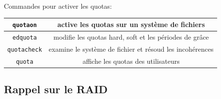 \documentclass[a4paper]{article}
\begin{document}
Commandes pour activer les quotas:
\begin{center}
    \begin{tabular}{|c|c|} \hline
        \texttt{quotaon} & active les quotas sur un système de fichiers \\ \hline
        \texttt{edquota} & modifie les quotas hard, soft et les périodes de grâce \\ \hline
        \texttt{quotacheck} & examine le système de fichier et résoud les incohérences \\ \hline
        \texttt{quota} & affiche les quotas des utilisateurs \\ \hline
    \end{tabular}
\end{center}










\subsection{Rappel sur le RAID}
\end{document}
